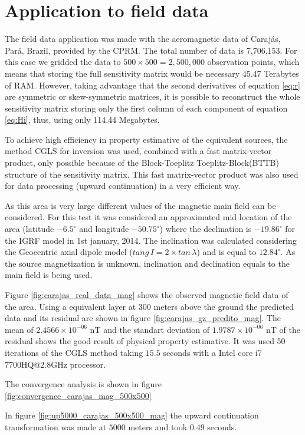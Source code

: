 \section{Application to field data}

The field data application was made with the aeromagnetic data of Carajás, Pará, Brazil, provided by the CPRM. 
The total number of data is 7,706,153. For this case we gridded the data to $500 \times 500 = 2,500,000$ observation points, which means that storing the full sensitivity matrix would be necessary 45.47 Terabytes of RAM. However, taking advantage that the second derivatives of equation \ref{eq:r} are symmetric or skew-symmetric matrices, it is possible to reconstruct the whole sensitivity matrix storing only the first column of each component of equation \ref{eq:Hi}, thus, using only 114.44 Megabytes.

To achieve high efficiency in property estimative of the equivalent sources, the method CGLS for inversion was used, combined with a fast matrix-vector product, only possible because of the Block-Toeplitz Toeplitz-Block(BTTB) structure of the sensitivity matrix. This fast matrix-vector product was also used for data processing (upward continuation) in a very efficient way.

As this area is very large different values of the magnetic main field can be considered. 
For this test it was considered an approximated mid location of the area (latitude $-6.5^{\circ}$ and longitude $-50.75^{\circ}$) where the declination is $-19.86^{\circ}$ for the IGRF model in 1st january, 2014. The inclination was calculated considering the Geocentric axial dipole model ($tang \, I = 2 \times tan \, \lambda$) and is equal to $12.84^{\circ}$. As the source magnetization is unknown, inclination and declination equals to the main field is being used.

Figure \ref{fig:carajas_real_data_mag} shows the observed magnetic field data of the area. Using a equivalent layer at $300$ meters above the ground the predicted data and its residual are shown in figure \ref{fig:carajas_gz_predito_mag}. The mean of $2.4566\times 10^{-06}$ nT and the standart deviation of $1.9787\times 10^{-06}$ nT of the residual shows the good result of physical property estimative. It was used 50 iterations of the CGLS method taking $15.5$ seconds with a Intel core i7 7700HQ@2.8GHz processor.

The convergence analysis is shown in figure \ref{fig:convergence_carajas_mag_500x500}

In figure \ref{fig:up5000_carajas_500x500_mag} the upward continuation transformation was made at $5000$ meters and took $0.49$ seconds.